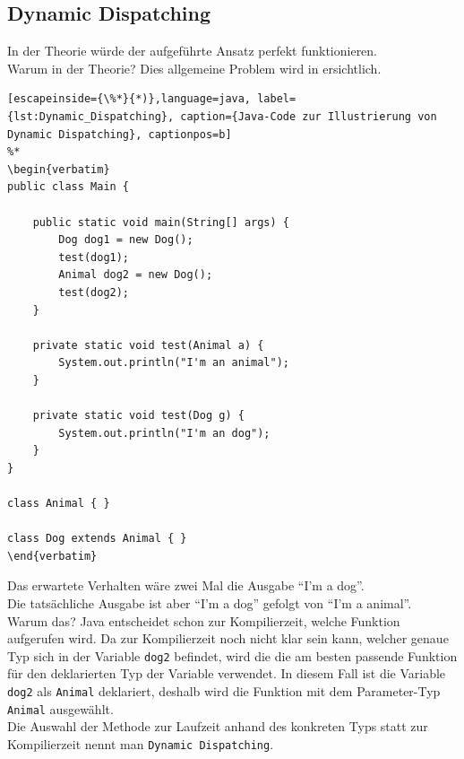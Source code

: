 \subsection{Dynamic Dispatching}
In der Theorie würde der aufgeführte Ansatz perfekt funktionieren.\\
Warum in der Theorie?
Dies allgemeine Problem wird in  ersichtlich.

\begin{lstlisting}[escapeinside={\%*}{*)},language=java, label={lst:Dynamic_Dispatching}, caption={Java-Code zur Illustrierung von Dynamic Dispatching}, captionpos=b]
%*
\begin{verbatim}
public class Main {

    public static void main(String[] args) {
        Dog dog1 = new Dog();
        test(dog1);
        Animal dog2 = new Dog();
        test(dog2);
    }

    private static void test(Animal a) {
        System.out.println("I'm an animal");
    }

    private static void test(Dog g) {
        System.out.println("I'm an dog");
    }
}

class Animal { }

class Dog extends Animal { }
\end{verbatim}
\end{lstlisting}
Das erwartete Verhalten wäre zwei Mal die Ausgabe ``I'm a dog''.\\
Die tatsächliche Ausgabe ist aber ``I'm a dog'' gefolgt von ``I'm a animal''.\\
Warum das?
Java entscheidet schon zur Kompilierzeit, welche Funktion aufgerufen wird.
Da zur Kompilierzeit noch nicht klar sein kann, welcher genaue Typ sich in der Variable \texttt{dog2} befindet, wird die die am besten passende Funktion für den deklarierten Typ der Variable verwendet. In diesem Fall ist die Variable \texttt{dog2} als \texttt{Animal} deklariert, deshalb wird die Funktion mit dem Parameter-Typ \texttt{Animal} ausgewählt.\\
Die Auswahl der Methode zur Laufzeit anhand des konkreten Typs statt zur Kompilierzeit nennt man \texttt{Dynamic Dispatching}.\\

